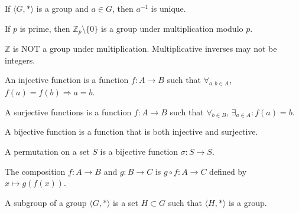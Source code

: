 \documentclass[crop=false,class=article,oneside]{standalone}
\begin{document}
            \begin{theorem}
                If $\langle G,*\rangle$ is a group and $a\in G$,
                then $a^{-1}$ is unique.
            \end{theorem}
            \begin{theorem}
                If $p$ is prime, then
                $\mathbb{Z}_p\setminus \{0\}$ is a group
                under multiplication modulo $p$.
            \end{theorem}
            \begin{remark}
                $\mathbb{Z}$ is NOT a group under
                multiplication. Multiplicative inverses may
                not be integers.
            \end{remark}
            \begin{definition}
                An injective function is a function
                $f:A\rightarrow B$ such that
                $\forall_{a,b\in A}$,
                $f(a)=f(b)\Rightarrow a=b$.
            \end{definition}
            \begin{definition}
                A surjective functions is a function
                $f:A\rightarrow B$ such that
                $\forall_{b\in B}$,
                $\exists_{a\in A}:f(a)=b$.
            \end{definition}
            \begin{definition}
                A bijective function is a function that
                is both injective and surjective.
            \end{definition}
            \begin{definition}
                A permutation on a set $S$ is a
                bijective function $\sigma:S\rightarrow S$.
            \end{definition}
            \begin{definition}
                The composition $f:A\rightarrow B$ and
                $g:B\rightarrow C$ is $g\circ f:A\rightarrow C$
                defined by $x\mapsto g(f(x))$.
            \end{definition}
            \begin{definition}
                A subgroup of a group $\langle G,*\rangle$ is
                a set $H\subset G$ such that $\langle H,*\rangle$
                is a group.
            \end{definition}
\end{document}
